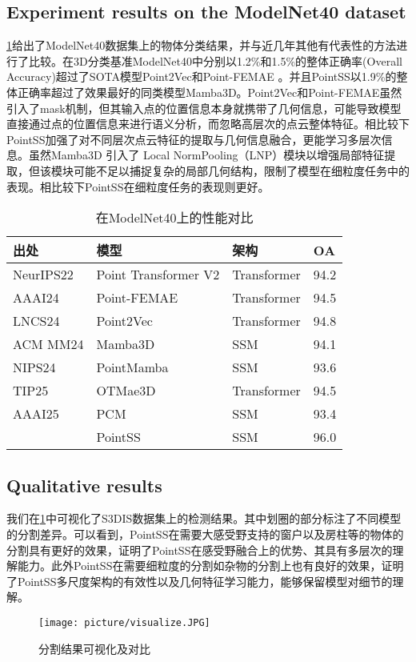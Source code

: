 \documentclass[preprint,12pt]{elsarticle}
\begin{document}
\subsection{Experiment results on the ModelNet40 dataset}
\cref{tab:ModelNet}给出了ModelNet40数据集上的物体分类结果，并与近几年其他有代表性的方法进行了比较。在3D分类基准ModelNet40中分别以1.2\%和1.5\%的整体正确率(Overall Accuracy)超过了SOTA模型Point2Vec\cite{Point2Vec}和Point-FEMAE\cite{FEMAE} 。并且PointSS以1.9\%的整体正确率超过了效果最好的同类模型Mamba3D。Point2Vec和Point-FEMAE虽然引入了mask机制，但其输入点的位置信息本身就携带了几何信息，可能导致模型直接通过点的位置信息来进行语义分析，而忽略高层次的点云整体特征。相比较下PointSS加强了对不同层次点云特征的提取与几何信息融合，更能学习多层次信息。虽然Mamba3D 引入了 Local NormPooling（LNP）模块以增强局部特征提取，但该模块可能不足以捕捉复杂的局部几何结构，限制了模型在细粒度任务中的表现。相比较下PointSS在细粒度任务的表现则更好。


\begin{table}[htbp!]
	\centering
	\caption{在ModelNet40上的性能对比}
	\label{tab:ModelNet}
	\begin{tabular}{@{}llll@{}}
		\toprule
		\textbf{出处}  & \textbf{模型}           & \textbf{架构} & \textbf{OA} \\ \midrule
		NeurIPS22 & Point Transformer V2\cite{ptv2}  & Transformer & 94.2          \\
		AAAI24    & Point-FEMAE\cite{FEMAE}        & Transformer & 94.5             \\
		LNCS24      & Point2Vec\cite{Point2Vec}      & Transformer & 94.8          \\
		ACM MM24     & Mamba3D\cite{Mamba3D}              & SSM & 94.1          \\
		NIPS24    & PointMamba\cite{PointMamba}   & SSM         & 93.6         \\
		TIP25     & OTMae3D\cite{OTMae3D}    & Transformer & 94.5          \\
		AAAI25    & PCM\cite{pcm}     & SSM         & 93.4         \\
		& PointSS               &SSM             & 96.0          \\ \bottomrule
	\end{tabular}
\end{table}

\subsection{Qualitative results}
我们在\cref{fig:vis}中可视化了S3DIS数据集上的检测结果。其中划圈的部分标注了不同模型的分割差异。可以看到，PointSS在需要大感受野支持的窗户以及房柱等的物体的分割具有更好的效果，证明了PointSS在感受野融合上的优势、其具有多层次的理解能力。此外PointSS在需要细粒度的分割如杂物的分割上也有良好的效果，证明了PointSS多尺度架构的有效性以及几何特征学习能力，能够保留模型对细节的理解。
\begin{figure}[htbp]
	\centering
	\texttt{[image: picture/visualize.JPG]}
	\caption{分割结果可视化及对比}
	\label{fig:vis}
\end{figure}
\end{document}
